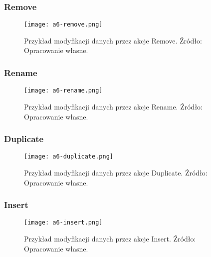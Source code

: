 \subsubsection{Remove}
\begin{figure}[!h]
    \centering \texttt{[image: a6-remove.png]}
    \caption{Przykład modyfikacji danych przez akcje Remove. Źródło: Opracowanie własne.}\label{fig:a6-remove}
\end{figure}
\subsubsection{Rename}
\begin{figure}[!h]
    \centering \texttt{[image: a6-rename.png]}
    \caption{Przykład modyfikacji danych przez akcje Rename. Źródło: Opracowanie własne.}\label{fig:a6-rename}
\end{figure}
\subsubsection{Duplicate}
\begin{figure}[!h]
    \centering \texttt{[image: a6-duplicate.png]}
    \caption{Przykład modyfikacji danych przez akcje Duplicate. Źródło: Opracowanie własne.}\label{fig:a6-duplicate}
\end{figure}
\subsubsection{Insert}
\begin{figure}[!h]
    \centering \texttt{[image: a6-insert.png]}
    \caption{Przykład modyfikacji danych przez akcje Insert. Źródło: Opracowanie własne.}\label{fig:a6-insert}
\end{figure}